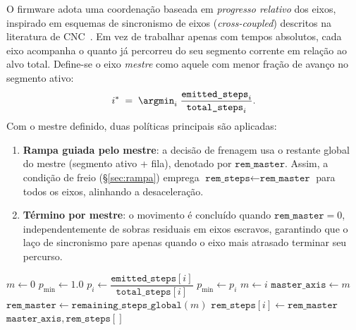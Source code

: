 O firmware adota uma coordena\c{c}\~ao baseada em \emph{progresso relativo} dos
eixos, inspirado em esquemas de sincronismo de eixos (\emph{cross-coupled})
descritos na literatura de CNC~\cite{efficient_reference,real_time_interpolators,koren_cnc_interpolators}.
Em vez de trabalhar apenas com tempos absolutos, cada eixo acompanha o
quanto j\'a percorreu do seu segmento corrente em rela\c{c}\~ao ao alvo total.
Define-se o eixo \emph{mestre} como aquele com menor fra\c{c}\~ao de avan\c{c}o
no segmento ativo:
\[
  i^{\ast} \;=\; \argmin_i \; \frac{\texttt{emitted\_steps}_i}{\texttt{total\_steps}_i}.
\]
Com o mestre definido, duas pol\'iticas principais s\~ao aplicadas:
\begin{enumerate}
  \item \textbf{Rampa guiada pelo mestre}: a decis\~ao de frenagem usa o
  restante global do mestre (segmento ativo + fila), denotado por
  $\texttt{rem\_master}$. Assim, a condi\c{c}\~ao de freio (\S\ref{sec:rampa})
  emprega $\texttt{rem\_steps} \leftarrow \texttt{rem\_master}$ para todos os eixos,
  alinhando a desacelera\c{c}\~ao.
  \item \textbf{T\'ermino por mestre}: o movimento \'e conclu\'ido quando
  $\texttt{rem\_master}=0$, independentemente de sobras residuais em eixos
  escravos, garantindo que o la\c{c}o de sincronismo pare apenas quando o
  eixo mais atrasado terminar seu percurso.
\end{enumerate}

\begin{algorithm}[H]
  \caption{Sele\c{c}\~ao de eixo mestre e coordena\c{c}\~ao de remanescentes}
  \label{alg:casc-progress}
  \begin{algorithmic}[1]
      \State $m \gets 0$
      \State $p_{\min} \gets 1.0$
          \State $p_i \gets \dfrac{\texttt{emitted\_steps}[i]}{\texttt{total\_steps}[i]}$
            \State $p_{\min} \gets p_i$
            \State $m \gets i$
          \EndIf
        \EndIf
      \EndFor
      \State $\texttt{master\_axis} \gets m$
      \State $\texttt{rem\_master} \gets \texttt{remaining\_steps\_global}(m)$
        \State $\texttt{rem\_steps}[i] \gets \texttt{rem\_master}$
      \EndFor
      \State \Return $\texttt{master\_axis}, \texttt{rem\_steps}[]$
    \EndProcedure
  \end{algorithmic}
\end{algorithm}

